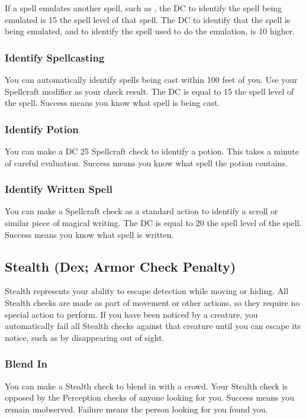 If a spell emulates another spell, such as , the DC to identify the spell being emulated is 15 \add the spell level of that spell. The DC to identify that the spell is being emulated, and to identify the spell used to do the emulation, is 10 higher.

\subsubsection{Identify Spellcasting}
You can automatically identify spells being cast within 100 feet of you. Use your Spellcraft modifier as your check result. The DC is equal to 15 \add the spell level of the spell. Success means you know what spell is being cast.

\subsubsection{Identify Potion}
You can make a DC 25 Spellcraft check to identify a potion. This takes a minute of careful evaluation. Success means you know what spell the potion contains.

\subsubsection{Identify Written Spell}
You can make a Spellcraft check as a standard action to identify a scroll or similar piece of magical writing. The DC is equal to 20 \add the spell level of the spell. Success means you know what spell is written.

\subsection{Stealth (Dex; Armor Check Penalty)}\label{Stealth}
Stealth represents your ability to escape detection while moving or hiding. All Stealth checks are made as part of movement or other actions, so they require no special action to perform. If you have been noticed by a creature, you automatically fail all Stealth checks against that creature until you can escape its notice, such as by disappearing out of sight. 

\subsubsection{Blend In}
You can make a Stealth check to blend in with a crowd. Your Stealth check is opposed by the Perception checks of anyone looking for you. Success means you remain unobserved. Failure means the person looking for you found you.

